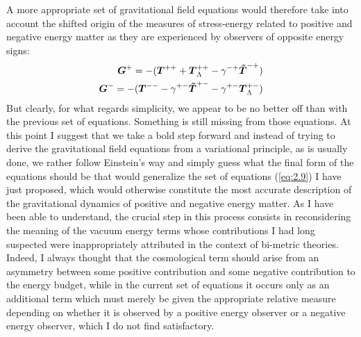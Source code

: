 \documentclass[notitlepage,12pt]{report}
\newcommand{\bm}[1]{\mbox{\boldmath $#1$}}
\begin{document}
A more appropriate set of gravitational field equations would therefore take into account the shifted origin of the measures of stress-energy related to positive and negative energy matter as they are experienced by observers of opposite energy signs:
\begin{eqnarray}\label{eq:2.9}
\bm{G}^+=-(\bm{T}^{++}+\bm{T}_{\Lambda}^{++}-\gamma^{-+}\bm{\tilde{T}}^{-+}) \\
\bm{G}^-=-(\bm{T}^{--}-\gamma^{+-}\bm{\tilde{T}}^{+-}-\gamma^{+-}\bm{T}_{\Lambda}^{+-}) \nonumber
\end{eqnarray}
But clearly, for what regards simplicity, we appear to be no better off than with the previous set of equations. Something is still missing from those equations. At this point I suggest that we take a bold step forward and instead of trying to derive the gravitational field equations from a variational principle, as is usually done, we rather follow Einstein's way and simply guess what the final form of the equations should be that would generalize the set of equations (\ref{eq:2.9}) I have just proposed, which would otherwise constitute the most accurate description of the gravitational dynamics of positive and negative energy matter. As I have been able to understand, the crucial step in this process consists in reconsidering the meaning of the vacuum energy terms whose contributions I had long suspected were inappropriately attributed in the context of bi-metric theories. Indeed, I always thought that the cosmological term should arise from an asymmetry between some positive contribution and some negative contribution to the energy budget, while in the current set of equations it occurs only as an additional term which must merely be given the appropriate relative measure depending on whether it is observed by a positive energy observer or a negative energy observer, which I do not find satisfactory.
\end{document}
